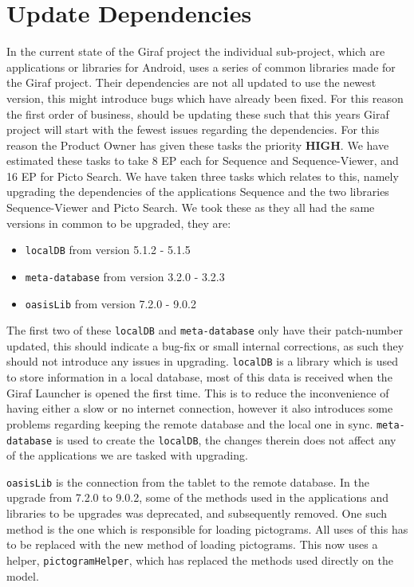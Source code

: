 \section{Update Dependencies} 
In the current state of the Giraf project the individual sub-project, which are applications or libraries for Android, uses a series of common libraries made for the Giraf project. 
Their dependencies are not all updated to use the newest version, this might introduce bugs which have already been fixed. 
For this reason the first order of business, should be updating these such that this years Giraf project will start with the fewest issues regarding the dependencies. 
For this reason the Product Owner has given these tasks the priority \textbf{HIGH}. 
We have estimated these tasks to take 8 EP each for Sequence and Sequence-Viewer, and 16 EP for Picto Search. 
We have taken three tasks which relates to this, namely upgrading the dependencies of the applications Sequence and the two libraries Sequence-Viewer and Picto Search. 
We took these as they all had the same versions in common to be upgraded, they are: 
\begin{itemize} 
    \item \texttt{localDB} from version 5.1.2 - 5.1.5 
    \item \texttt{meta-database} from version 3.2.0 - 3.2.3 
    \item \texttt{oasisLib} from version 7.2.0 - 9.0.2 
\end{itemize} 
The first two of these \texttt{localDB} and \texttt{meta-database} only have their patch-number updated, this should indicate a bug-fix or small internal corrections, as such they should not introduce any issues in upgrading. 
\texttt{localDB} is a library which is used to store information in a local database, most of this data is received when the Giraf Launcher is opened the first time. 
This is to reduce the inconvenience of having either a slow or no internet connection, however it also introduces some problems regarding keeping the remote database and the local one in sync. 
\texttt{meta-database} is used to create the \texttt{localDB}, the changes therein does not affect any of the applications we are tasked with upgrading. 
  
\texttt{oasisLib} is the connection from the tablet to the remote database. 
In the upgrade from 7.2.0 to 9.0.2, some of the methods used in the applications and libraries to be upgrades was deprecated, and subsequently removed. 
One such method is the one which is responsible for loading pictograms. 
All uses of this has to be replaced with the new method of loading pictograms. 
This now uses a helper, \texttt{pictogramHelper}, which has replaced the methods used directly on the model. 
  
